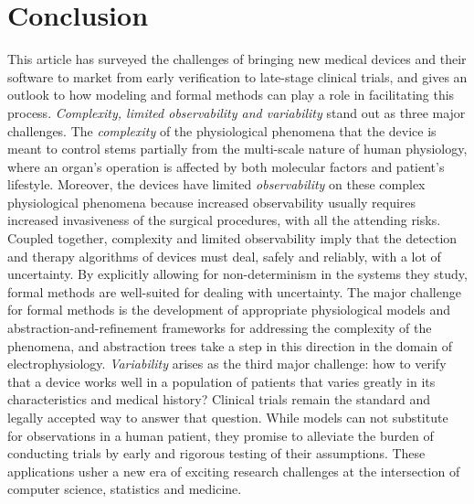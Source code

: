 \section{Conclusion}

This article has surveyed the challenges of bringing new medical devices and their software to market from early verification to late-stage clinical trials, and gives an outlook to how modeling and formal methods can play a role in facilitating this process.
\emph{Complexity, limited observability and variability} stand out as three major challenges.
The \emph{complexity} of the physiological phenomena that the device is meant to control stems partially from the multi-scale nature of human physiology, where an organ's operation is affected by both molecular factors and patient's lifestyle.
Moreover, the devices have limited \emph{observability} on these complex physiological phenomena because increased observability usually requires increased invasiveness of the surgical procedures, with all the attending risks.
Coupled together, complexity and limited observability imply that the detection and therapy algorithms of devices must deal, safely and reliably, with a lot of uncertainty.
By explicitly allowing for non-determinism in the systems they study, formal methods are well-suited for dealing with uncertainty.
The major challenge for formal methods is the development of appropriate physiological models and abstraction-and-refinement frameworks for addressing the complexity of the phenomena, and abstraction trees take a step in this direction in the domain of electrophysiology.
\emph{Variability} arises as the third major challenge: how to verify that a device works well in a population of patients that varies greatly in its characteristics and medical history?
Clinical trials remain the standard and legally accepted way to answer that question.
While models can not substitute for observations in a human patient, they promise to alleviate the burden of conducting trials by early and rigorous testing of their assumptions.
These applications usher a new era of exciting research challenges at the intersection of computer science, statistics and medicine.

